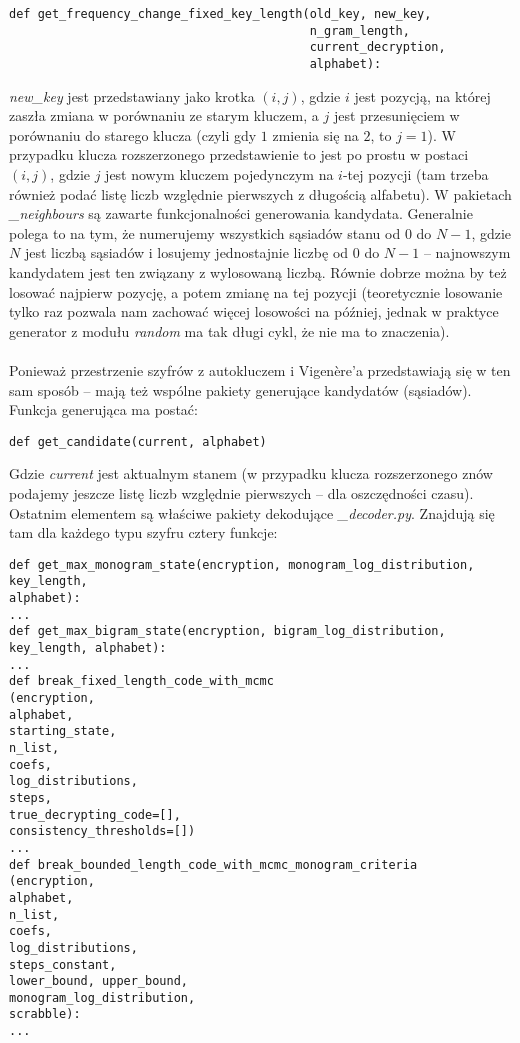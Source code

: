 \documentclass[a4paper]{article}
\theoremstyle{defn}
\theoremstyle{theorem}
\theoremstyle{lemma}
\theoremstyle{cor}
\theoremstyle{fact}
\begin{document}
\begin{lstlisting}
def get_frequency_change_fixed_key_length(old_key, new_key,
                                          n_gram_length,
                                          current_decryption,
                                          alphabet):
\end{lstlisting}
\textit{new\_key} jest przedstawiany jako krotka $(i,j)$, gdzie $i$ jest pozycją, na której zaszła zmiana w porównaniu ze starym kluczem, a $j$ jest przesunięciem w porównaniu do starego klucza (czyli gdy $1$ zmienia się na $2$, to $j=1$). W przypadku klucza rozszerzonego przedstawienie to jest po prostu w postaci $(i,j)$, gdzie $j$ jest nowym kluczem pojedynczym na $i$-tej pozycji (tam trzeba również podać listę liczb względnie pierwszych z długością alfabetu). W pakietach \textit{\_neighbours} są zawarte funkcjonalności generowania kandydata. Generalnie polega to na tym, że numerujemy wszystkich sąsiadów stanu od $0$ do $N-1$, gdzie $N$ jest liczbą sąsiadów i losujemy jednostajnie liczbę od $0$ do $N-1$ – najnowszym kandydatem jest ten związany z wylosowaną liczbą. Równie dobrze można by też losować najpierw pozycję, a potem zmianę na tej pozycji (teoretycznie losowanie tylko raz pozwala nam zachować więcej losowości na później, jednak w praktyce generator z modułu \textit{random} ma tak długi cykl, że nie ma to znaczenia).\\\\
Ponieważ przestrzenie szyfrów z autokluczem i Vigenère'a przedstawiają się w ten sam sposób – mają też wspólne pakiety generujące kandydatów (sąsiadów). Funkcja generująca ma postać:
\begin{lstlisting}
def get_candidate(current, alphabet)
\end{lstlisting}
Gdzie \textit{current} jest aktualnym stanem (w przypadku klucza rozszerzonego znów podajemy jeszcze listę liczb względnie pierwszych – dla oszczędności czasu).\\
Ostatnim elementem są właściwe pakiety dekodujące \textit{\_decoder.py}. Znajdują się tam dla każdego typu szyfru cztery funkcje:
\begin{lstlisting}
def get_max_monogram_state(encryption, monogram_log_distribution, key_length,
alphabet):
...
def get_max_bigram_state(encryption, bigram_log_distribution, key_length, alphabet):
...
def break_fixed_length_code_with_mcmc
(encryption,
alphabet,
starting_state,
n_list,
coefs,
log_distributions,
steps,
true_decrypting_code=[],
consistency_thresholds=[])
...
def break_bounded_length_code_with_mcmc_monogram_criteria
(encryption,                                                                  alphabet,
n_list,
coefs,
log_distributions,
steps_constant,
lower_bound, upper_bound,
monogram_log_distribution,
scrabble):
...
\end{lstlisting}
\end{document}
